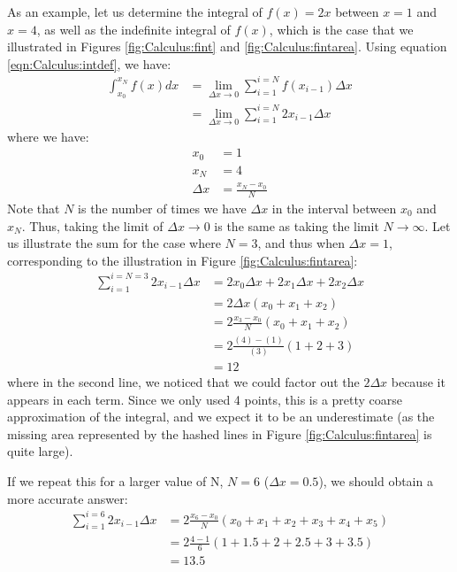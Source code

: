 As an example, let us determine the integral of $f(x)=2x$ between $x=1$ and $x=4$, as well as the indefinite integral of $f(x)$, which is the case that we illustrated in Figures \ref{fig:Calculus:fint} and \ref{fig:Calculus:fintarea}. Using equation \ref{eqn:Calculus:intdef}, we have:
\begin{align*}
\int_{x_0}^{x_N}f(x) dx&=\lim_{\Delta x\to 0}\sum_{i=1}^{i=N} f(x_{i-1}) \Delta x \\
&=\lim_{\Delta x\to 0}\sum_{i=1}^{i=N} 2x_{i-1} \Delta x 
\end{align*}
where we have:
\begin{align*}
x_0 &=1 \\
x_N &=4 \\
\Delta x &= \frac{x_N-x_0}{N}
\end{align*}
Note that $N$ is the number of times we have $\Delta x$ in the interval between $x_0$ and $x_N$. Thus, taking the limit of $\Delta x\to 0$ is the same as taking the limit $N\to\infty$. Let us illustrate the sum for the case where $N=3$, and thus when $\Delta x=1$, corresponding to the illustration in Figure \ref{fig:Calculus:fintarea}:
\begin{align*}
\sum_{i=1}^{i=N=3} 2x_{i-1} \Delta x &=2x_0\Delta x+2x_1\Delta x+2x_2\Delta x\\
&=2\Delta x (x_0+x_1+x_2) \\
&=2 \frac{x_3-x_0}{N}(x_0+x_1+x_2) \\
&=2 \frac{(4)-(1)}{(3)}(1+2+3) \\
&=12
\end{align*}
where in the second line, we noticed that we could factor out the $2\Delta x$ because it appears in each term. Since we only used 4 points, this is a pretty coarse approximation of the integral, and we expect it to be an underestimate (as the missing area represented by the hashed lines in Figure \ref{fig:Calculus:fintarea} is quite large).

If we repeat this for a larger value of N, $N=6$ ($\Delta x = 0.5$), we should obtain a more accurate answer:
\begin{align*}
\sum_{i=1}^{i=6} 2x_{i-1} \Delta x &=2 \frac{x_6-x_0}{N}(x_0+x_1+x_2+x_3+x_4+x_5)\\
&=2\frac{4-1}{6} (1+1.5+2+2.5+3+3.5)\\
&=13.5
\end{align*}

